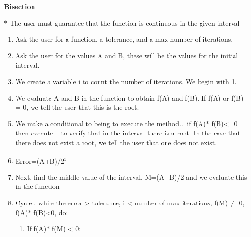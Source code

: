 \documentclass[12pt]{article}
\renewcommand{\_}{\kern-1.5pt\textunderscore\kern-1.5pt}
\begin{document}
{\fontsize{16pt}{19.2pt}\selectfont \textbf{\uline{Bisection }}\par}\par


\vspace{\baselineskip}
$\ast$ The user must guarantee that the function is continuous in the given interval\par

\begin{enumerate}
	\item Ask the user for a function, a tolerance, and a max number of iterations. \par

	\item Ask the user for the values A and B, these will be the values for the initial interval.\par

	\item We create a variable i to count the number of iterations. We begin with 1. \par

	\item We evaluate A and B in the function to obtain f(A) and f(B). If f(A) or f(B) = 0, we tell the user that this is the root. \par

	\item We make a conditional to being to execute the method$ \ldots $  if f(A)$\ast$ f(B)<=0 then execute$ \ldots $  to verify that in the interval there is a root. In the case that there does not exist a root, we tell the user that one does not exist.\par


\vspace{\baselineskip}
	\item Error=(A+B)/2\textsuperscript{i }\par


\vspace{\baselineskip}
	\item Next, find the middle value of the interval. M=(A+B)/2 and we evaluate this in the function\par


\vspace{\baselineskip}
	\item Cycle : while the error > tolerance, i < number of max iterations, f(M)$ \neq $ 0, f(A)$\ast$ f(B)<0, do:\par


\vspace{\baselineskip}
\begin{enumerate}
	\item If f(A)$\ast$ f(M) < 0:\par


\end{enumerate}
\end{enumerate}
\end{document}
